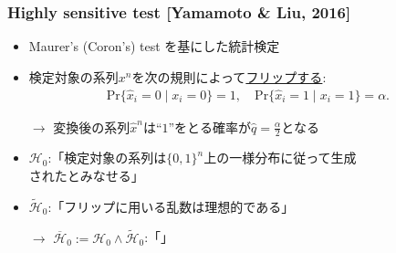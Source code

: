 \documentclass[dvipdfmx,11pt]{beamer}
\begin{document}
\begin{frame}[c]\frametitle{Highly sensitive test [Yamamoto \& Liu, 2016]}
\begin{itemize}\setlength{\itemsep}{0.5\baselineskip}
  \item Maurer's (Coron's) test を基にした統計検定
  \item 検定対象の系列$x^n$を次の規則によって\underline{フリップする}:
    \begin{align*}
      \mathrm{Pr}\{ \hat{x}_i = 0 \mid x_i = 0 \} = 1, \quad
      \mathrm{Pr}\{ \hat{x}_i = 1 \mid x_i = 1 \} = \alpha.
    \end{align*}
  \item[$\to$] 変換後の系列$\hat{x}^n$は\alert{``$1$''をとる確率が$\hat{q}=\frac{\alpha}{2}$}となる
\end{itemize}
\vspace{\baselineskip}
\vspace{.5\baselineskip}
\begin{itemize}\setlength{\itemsep}{0.25\baselineskip}  
  \item $\mathcal{H}_0$:「検定対象の系列は$\{0,1\}^n$上の一様分布に従って生成\\されたとみなせる」
  \item $\widetilde{\mathcal{H}}_0$:「フリップに用いる乱数は理想的である」
\end{itemize}
%
\begin{itemize}
  \item[$\to$] $\overline{\mathcal{H}}_0:=\mathcal{H}_0 \land \widetilde{\mathcal{H}}_0$:「」
\end{itemize}
\end{frame}
\end{document}
